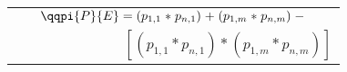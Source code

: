 \tiny
\begin{tabular}{@{}c@{}}
$\qqpi{P}{E} = \left( p_{1,1} \mathrel{*} p_{n,1} \right) \mathrel{+} \left( p_{1,m} \mathrel{*} p_{n,m} \right) \mathrel{-}$\\
\ \ \ \ \ \ \ \ \ \ \ \ \ \ \ $[ \left(p_{1,1} \mathrel{*} p_{n,1}\right) \mathrel{*} \left(p_{1,m} \mathrel{*} p_{n,m}\right)]$
\end{tabular}